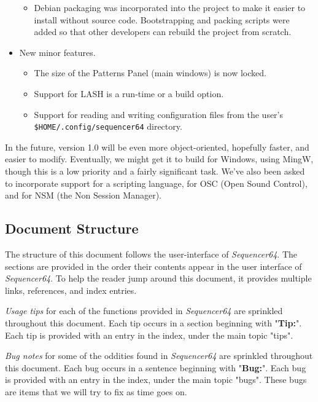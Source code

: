 \documentclass[
 11pt,
 twoside,
 a4paper,
 headinclude,
 footinclude,
 final                                 %
]{article}
\begin{document}
\begin{itemize}
\begin{itemize}
         \item Debian packaging was incorporated into the project to make it
            easier to install without source code.  Bootstrapping and
            packing scripts were added so that other developers can rebuild the
            project from scratch.
      \end{itemize}
      \item New minor features.
      \begin{itemize}
         \item The size of the Patterns Panel (main windows) is now locked.
         \item Support for LASH is a run-time or a build option.
         \item Support for reading and writing configuration files from the
            user's \texttt{\$HOME/.config/sequencer64} directory.
      \end{itemize}
   \end{itemize}

   In the future, version 1.0 will be even more object-oriented, hopefully
   faster, and easier to modify.  Eventually, we might get it to build
   for Windows, using MingW, though this is a low priority and a fairly
   significant task.  We've also been asked to incorporate support for a
   scripting language, for OSC (Open Sound Control), and for NSM (the Non
   Session Manager).

\subsection{Document Structure}
\label{subsec:introduction_document_structure}

   The structure of this document follows the user-interface of
   \textsl{Sequencer64}.  The sections are provided in the order
   their contents appear in the user interface of \textsl{Sequencer64}.  To
   help the reader jump around this document, it provides
   multiple links, references, and index entries.

   \textsl{Usage tips}
   for each of the functions provided in
   \textsl{Sequencer64} are sprinkled throughout this document.
   Each tip occurs in a section beginning with "\textbf{Tip:}".
   Each tip is provided with an entry in the index, under the
   main topic "tips".

   \textsl{Bug notes}
   for some of the oddities found in \textsl{Sequencer64} are
   sprinkled throughout this document.
   Each bug occurs in a sentence beginning with "\textbf{Bug:}".
   Each bug is provided with an entry in the index, under the
   main topic "bugs".  These bugs are items that we will try to
   fix as time goes on.
\end{document}
